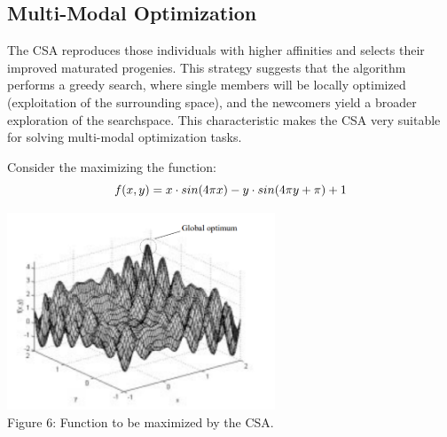 \documentclass{article}
\begin{document}
\subsection{Multi-Modal Optimization}
The CSA reproduces those individuals with higher affinities and selects their improved maturated progenies. This strategy suggests that the algorithm performs a greedy search, where single members will be locally optimized (exploitation of the surrounding space), and the newcomers yield a broader exploration of the searchspace. This characteristic makes the CSA very suitable for solving multi-modal optimization tasks.

Consider the maximizing the function:
\begin{equation} \small{
f(x, y) = x \cdot sin(4 \pi x) - y \cdot sin(4 \pi y + \pi) +1}
 \end{equation}

\begin{center} 
\includegraphics[width=8cm,clip]{images/cj_func_maxi.png}\\
\caption{Figure 6: Function to be maximized by the CSA.}	
\end{center} 
\end{document}
